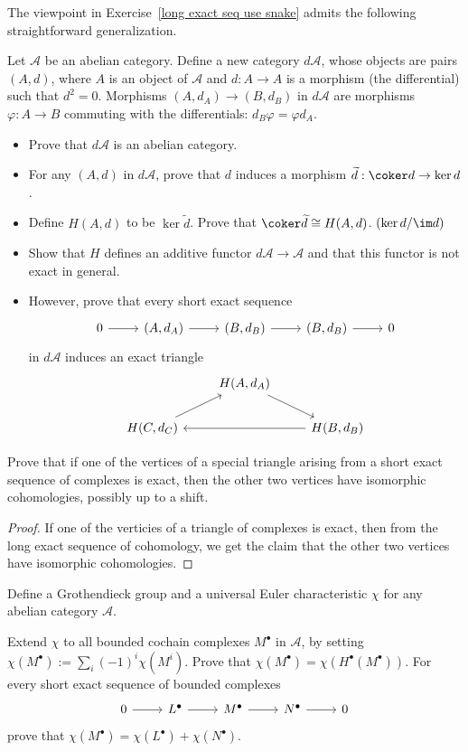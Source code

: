 \begin{exercise}
The viewpoint in Exercise~\ref{long exact seq use snake} admits the following straightforward generalization.\par
Let $\mathcal{A}$ be an abelian category. Define a new category $d{\mathcal{A}}$, whose objects are pairs $(A,d)$, where $A$ is an object of $\mathcal{A}$ and $d:A\to A$ is a morphism (the differential) such that $d^2=0$. Morphisms $(A,d_A)\to(B,d_B)$ in $d\mathcal{A}$ are morphisms $\varphi:A\to B$ commuting with the differentials: $d_B\varphi=\varphi d_A$.
\begin{itemize}
\item Prove that $d\mathcal{A}$ is an abelian category.
\item For any $(A, d)$ in $d\mathcal{A}$, prove that $d$ induces a morphism $\widetilde{d}:\coker d\to\ker d$.
\item Define $H(A,d)$ to be $\ker\widetilde{d}$. Prove that $\coker\widetilde{d}\cong H(A,d)$. $(\ker d/\im d)$
\item Show that $H$ defines an additive functor $d\mathcal{A}\to\mathcal{A}$ and that this functor is not exact in general.
\item However, prove that every short exact sequence
\[\begin{tikzcd}
0\ar[r]&(A,d_A)\ar[r]&(B,d_B)\ar[r]&(B,d_B)\ar[r]&0
\end{tikzcd}\]
in $d\mathcal{A}$ induces an exact triangle
\[\begin{tikzcd}
&H(A,d_A)\ar[rd]&\\
H(C,d_C)\ar[ru]&&H(B,d_B)\ar[ll]
\end{tikzcd}\]
\end{itemize}
\end{exercise}
\begin{exercise}
Prove that if one of the vertices of a special triangle arising from a short exact sequence of complexes is exact, then the other two vertices have isomorphic cohomologies, possibly up to a shift.
\end{exercise}
\begin{proof}
If one of the verticies of a triangle of complexes is exact, then from the long exact sequence of cohomology, we get the claim that the other two vertices have isomorphic cohomologies.
\end{proof}
\begin{exercise}
Define a Grothendieck group and a universal Euler characteristic $\chi$ for any abelian category $\mathcal{A}$.\par
Extend $\chi$ to all bounded cochain complexes $M^\bullet$ in $\mathcal{A}$, by setting $\chi(M^\bullet):=\sum_i(-1)^i\chi(M^i)$. Prove that $\chi(M^\bullet)=\chi(H^\bullet(M^\bullet))$. For every short exact sequence of bounded complexes 
\[\begin{tikzcd}
0\ar[r]&L^\bullet\ar[r]&M^\bullet\ar[r]&N^\bullet\ar[r]&0
\end{tikzcd}\]
prove that $\chi(M^\bullet)=\chi(L^\bullet)+\chi(N^\bullet)$.
\end{exercise}

